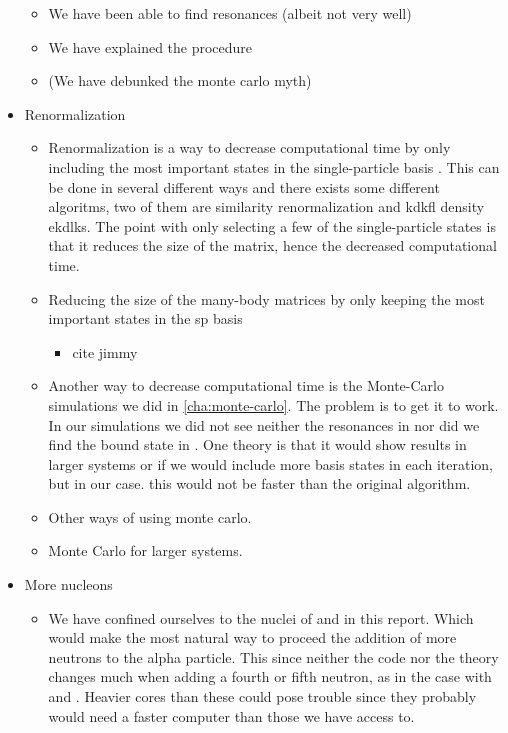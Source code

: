 \documentclass[../main/report.tex]{subfiles}
\begin{document}
\begin{itemize}
  \begin{itemize}
    \item We have been able to find resonances (albeit not very well)
    \item We have explained the procedure
    \item (We have debunked the monte carlo myth)
  \end{itemize}
  \item Renormalization
  \begin{itemize}
    \item Renormalization is a way to decrease computational time by only including the most important states in the single-particle basis \cite{jimmy}.
    This can be done in several different ways and there exists some different algoritms, two of them are similarity renormalization and kdkfl density ekdlks.
    The point with only selecting a few of the single-particle states is that it reduces the size of the matrix, hence the decreased computational time.
    \item Reducing the size of the many-body matrices by only keeping the most important states in the sp basis
    \begin{itemize}
      \item cite jimmy
    \end{itemize}
    \item Another way to decrease computational time is the Monte-Carlo simulations we did in \cref{cha:monte-carlo}.
    The problem is to get it to work.
    In our simulations we did not see neither the resonances in  nor did we find the bound state in .
    One theory is that it would show results in larger systems or if we would include more basis states in each iteration, but in our case. this would not be faster than the original algorithm.
    \item Other ways of using monte carlo.
    \item Monte Carlo for larger systems.
  \end{itemize}

  \item More nucleons
  \begin{itemize}
    \item We have confined ourselves to the nuclei of  and  in this report.
    Which would make the most natural way to proceed the addition of more neutrons to the alpha particle.
    This since neither the code nor the theory changes much when adding a fourth or fifth neutron, as in the case with  and .
    Heavier cores than these could pose trouble since they probably would need a faster computer than those we have access to.


\end{itemize}
\end{itemize}
\end{document}

